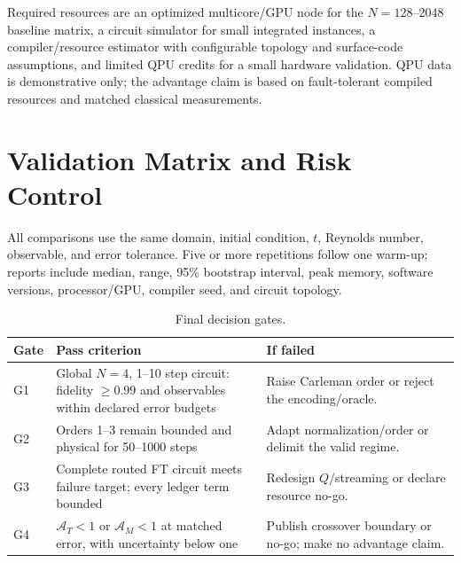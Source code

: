 \documentclass[10pt,twocolumn]{article}
\begin{document}
Required resources are an optimized multicore/GPU node for the $N=128$--2048
baseline matrix, a circuit simulator for small integrated instances, a
compiler/resource estimator with configurable topology and surface-code
assumptions, and limited QPU credits for a small hardware validation. QPU data
is demonstrative only; the advantage claim is based on fault-tolerant compiled
resources and matched classical measurements.

\section{Validation Matrix and Risk Control}
All comparisons use the same domain, initial condition, $t$, Reynolds number,
observable, and error tolerance. Five or more repetitions follow one warm-up;
reports include median, range, 95\% bootstrap interval, peak memory, software
versions, processor/GPU, compiler seed, and circuit topology.

\begin{table}[!ht]
\centering
\caption{Final decision gates.}
\label{tab:validation}
\scriptsize
\begin{tabularx}{\columnwidth}{@{}p{8mm}p{33mm}X@{}}
\toprule Gate&Pass criterion&If failed\\\midrule
G1&Global $N=4$, 1--10 step circuit: fidelity $\geq0.99$ and observables within
declared error budgets&Raise Carleman order or reject the encoding/oracle.\\
G2&Orders 1--3 remain bounded and physical for 50--1000 steps&Adapt
normalization/order or delimit the valid regime.\\
G3&Complete routed FT circuit meets failure target; every ledger term bounded&
Redesign $Q$/streaming or declare resource no-go.\\
G4&$\mathcal A_T<1$ or $\mathcal A_M<1$ at matched error, with uncertainty below
one&Publish crossover boundary or no-go; make no advantage claim.\\\bottomrule
\end{tabularx}
\end{table}
\end{document}
